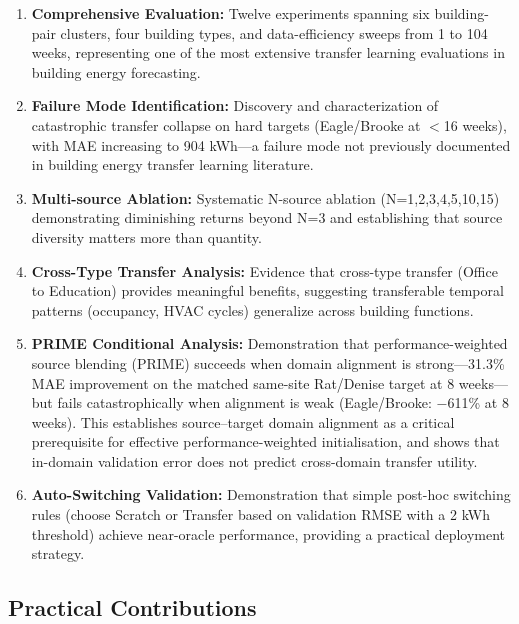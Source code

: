\documentclass[12pt,a4paper]{report}
\begin{document}
\begin{enumerate}
    \item \textbf{Comprehensive Evaluation:} Twelve experiments spanning six building-pair clusters, four building types, and data-efficiency sweeps from 1 to 104 weeks, representing one of the most extensive transfer learning evaluations in building energy forecasting.
    
    \item \textbf{Failure Mode Identification:} Discovery and characterization of catastrophic transfer collapse on hard targets (Eagle/Brooke at $<$16 weeks), with MAE increasing to 904 kWh—a failure mode not previously documented in building energy transfer learning literature.
    
    \item \textbf{Multi-source Ablation:} Systematic N-source ablation (N=1,2,3,4,5,10,15) demonstrating diminishing returns beyond N=3 and establishing that source diversity matters more than quantity.
    
    \item \textbf{Cross-Type Transfer Analysis:} Evidence that cross-type transfer (Office to Education) provides meaningful benefits, suggesting transferable temporal patterns (occupancy, HVAC cycles) generalize across building functions.
    
    \item \textbf{PRIME Conditional Analysis:} Demonstration that performance-weighted source blending (PRIME) succeeds when domain alignment is strong---31.3\% MAE improvement on the matched same-site Rat/Denise target at 8 weeks---but fails catastrophically when alignment is weak (Eagle/Brooke: $-$611\% at 8 weeks). This establishes source--target domain alignment as a critical prerequisite for effective performance-weighted initialisation, and shows that in-domain validation error does not predict cross-domain transfer utility.
    
    \item \textbf{Auto-Switching Validation:} Demonstration that simple post-hoc switching rules (choose Scratch or Transfer based on validation RMSE with a 2 kWh threshold) achieve near-oracle performance, providing a practical deployment strategy.
\end{enumerate}

\subsection{Practical Contributions}
\end{document}
